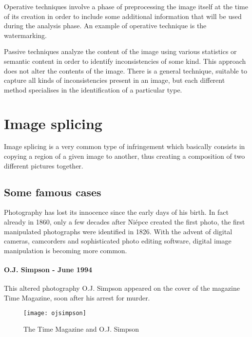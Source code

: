 Operative techniques involve a phase of preprocessing the image itself at the time of its creation in order to include some additional information that will be used during the analysis phase. An example of operative technique is the watermarking.

Passive techniques analyze the content of the image using various statistics or semantic content in order to identify inconsistencies of some kind. This approach does not alter the contents of the image.
There is a general technique, suitable to capture all kinds of inconsistencies present in an image, but each different method specialises in the identification of a particular type.

\section{Image splicing}

Image splicing is a very common type of infringement which basically consists in copying a region of a given image to another, thus creating a composition of two different pictures together.



\subsection{Some famous cases}

Photography has lost its innocence since the early days of his birth. In fact already in 1860, only a few decades after Niépce created the first photo, the first manipulated photographs were identified in 1826. With the advent of digital cameras, camcorders and sophisticated photo editing software, digital image manipulation is becoming more common. 

\paragraph{O.J. Simpson - June 1994}

This altered photography O.J. Simpson appeared on the cover of the magazine Time Magazine, soon after his arrest for murder. 

\begin{wrapfigure}{r}{0.5\textwidth}
  \begin{center}
    \texttt{[image: ojsimpson]}
  \end{center}
  \caption{The Time Magazine and O.J. Simpson}
  \vspace{-1cm}
\end{wrapfigure}

